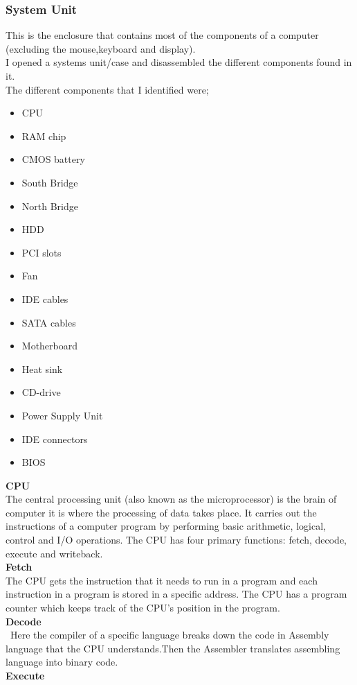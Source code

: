 \documentclass{article}
\begin{document}
\subsubsection{System Unit}
This is the enclosure that contains most of the components of a computer (excluding the mouse,keyboard and display).\\
I opened a systems unit/case and disassembled the different components found in it.\\
The different components that I identified were;
\begin{itemize}
\item CPU
\item  RAM chip
\item CMOS battery
\item South Bridge
\item North Bridge
\item HDD
\item PCI slots
\item Fan
\item IDE cables
 \item SATA cables
\item  Motherboard
 \item Heat sink
\item CD-drive
 \item Power Supply Unit
\item IDE connectors
\item BIOS
\end{itemize}
\textbf{CPU}\\
 The central processing unit (also known as the microprocessor) is the brain of computer it is where the processing of data takes place. It carries out the instructions of a computer program by performing basic arithmetic, logical, control and I/O operations. The CPU has four primary functions: fetch, decode, execute and writeback.\\
\textbf{Fetch}\\
 The CPU gets the instruction that it needs to run in a program and each instruction in a program is stored in a specific address. The CPU has a program counter which keeps track of the CPU’s position in the program.\\
\textbf{Decode}\\
\ Here the compiler of a specific language breaks down the code in Assembly language that the CPU understands.Then the Assembler translates assembling language into binary code.\\
\textbf{Execute}\\
\end{document}
